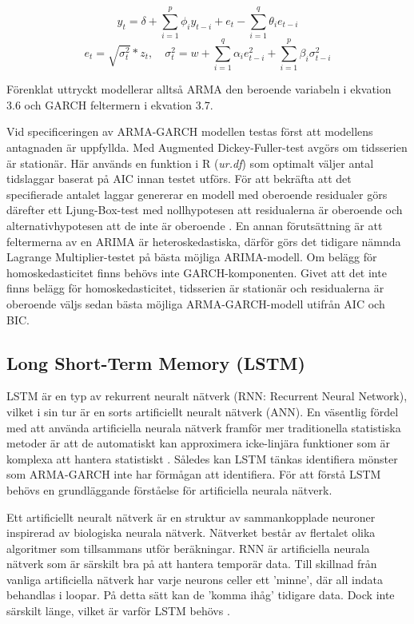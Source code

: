 \documentclass[11pt]{article}
\numberwithin{equation}{section}
\numberwithin{table}{section}
\numberwithin{figure}{section}
\begin{document}
\begin{equation}
    y_t = \delta + \sum_{i=1}^{p}\phi_iy_{t-i}  +e_t - \sum_{i=1}^{q}\theta_i e_{t-i} 
\end{equation}
\begin{equation}
    e_t=\sqrt{\sigma_t^2}*z_t,\quad \sigma^2_t=w + \sum_{i=1}^{q}\alpha_i e^2_{t-i} + \sum_{i=1}^{p}\beta_i \sigma^2_{t-i}
\end{equation}

Förenklat uttryckt modellerar alltså ARMA den beroende variabeln i ekvation 3.6 och GARCH feltermern i ekvation 3.7. 

Vid specificeringen av ARMA-GARCH modellen testas först att modellens antagnaden är uppfyllda. Med Augmented Dickey-Fuller-test avgörs om tidsserien är stationär. Här används en funktion  i R (\textit{ur.df}) som optimalt väljer antal tidslaggar baserat på AIC innan testet utförs.  För att bekräfta att det specifierade antalet laggar genererar en modell med oberoende residualer görs därefter ett Ljung-Box-test med nollhypotesen att residualerna är oberoende och alternativhypotesen att de inte är oberoende \parencite{box1970distribution}. En annan förutsättning är att feltermerna av en ARIMA är heteroskedastiska, därför görs det tidigare nämnda Lagrange Multiplier-testet på bästa möjliga ARIMA-modell. Om belägg för homoskedasticitet finns behövs inte GARCH-komponenten. Givet att det inte finns belägg för homoskedasticitet, tidsserien är stationär och residualerna är oberoende väljs sedan bästa möjliga ARMA-GARCH-modell utifrån AIC och BIC. 


\subsection{Long Short-Term Memory (LSTM)}
LSTM är en typ av rekurrent neuralt nätverk (RNN: Recurrent Neural Network), vilket i sin tur är en sorts artificiellt neuralt nätverk (ANN). En väsentlig fördel med att använda artificiella neurala nätverk framför mer traditionella statistiska metoder är att de automatiskt kan approximera icke-linjära funktioner som är komplexa att hantera statistiskt \parencite{paliwal2009neural}. Således kan LSTM tänkas identifiera mönster som ARMA-GARCH inte har förmågan att identifiera.  För att förstå LSTM behövs en grundläggande förståelse för artificiella neurala nätverk. 

Ett artificiellt neuralt nätverk är en struktur av sammankopplade neuroner inspirerad av biologiska neurala nätverk. Nätverket består av flertalet olika algoritmer som tillsammans utför beräkningar. RNN är artificiella neurala nätverk som är särskilt bra på att hantera temporär data. Till skillnad från vanliga artificiella nätverk har varje neurons celler ett 'minne', där all indata behandlas i loopar. På detta sätt kan de 'komma ihåg' tidigare data. Dock inte särskilt länge, vilket är varför LSTM behövs \parencite[][,s.478-559]{purkait2019hands}. 
\end{document}
